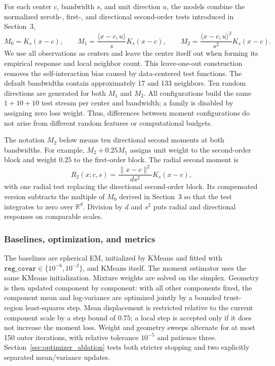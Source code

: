 \documentclass[11pt,a4paper]{article}
\newcommand{\Mzero}{M_0}
\newcommand{\Mone}{M_1}
\newcommand{\Mtwo}{M_2}
\newcommand{\Rtwo}{R_2}
\begin{document}
For each center $c$, bandwidth $s$, and unit direction $u$, the models combine
the normalized zeroth-, first-, and directional second-order tests introduced
in Section~3,
\[
  \Mzero=K_s(x-c),\qquad
  \Mone=\frac{\langle x-c,u\rangle}{s}K_s(x-c),\qquad
  \Mtwo=\frac{\langle x-c,u\rangle^2}{s^2}K_s(x-c).
\]
We use all observations as centers and leave the center itself out when
forming its empirical response and local neighbor count.  This leave-one-out
construction removes the self-interaction bias caused by data-centered test
functions.  The default bandwidths contain approximately 17 and 133
neighbors.  Ten random directions are generated for both $\Mone$ and
$\Mtwo$.  All configurations build the same $1+10+10$ test stream per
center and bandwidth; a family is disabled by assigning zero loss weight.
Thus, differences between moment configurations do not arise from different
random features or computational budgets.

The notation $\Mtwo$ below means ten directional second moments at both
bandwidths.  For example, $\Mtwo+0.25\Mone$ assigns unit weight to the
second-order block and weight $0.25$ to the first-order block.  The radial
second moment is
\[
 \Rtwo(x;c,s)=\frac{\|x-c\|^2}{d s^2}K_s(x-c),
\]
with one radial test replacing the directional second-order block.  Its
compensated version subtracts the multiple of $\Mzero$ derived in Section~3
so that the test integrates to zero over $\mathbb R^d$.  Division by $d$ and
$s^2$ puts radial and directional responses on comparable scales.

\subsubsection{Baselines, optimization, and metrics}

The baselines are spherical EM, initialized by KMeans and fitted with
$\texttt{reg\_covar}\in\{10^{-6},10^{-2}\}$, and KMeans itself.  The moment
estimator uses the same KMeans initialization.  Mixture weights are solved on
the simplex.  Geometry is then updated component by component: with all other
components fixed, the component mean and log-variance are optimized jointly
by a bounded trust-region least-squares step.  Mean displacement is restricted
relative to the current component scale by a step bound of $0.75$; a local step is accepted only if it
does not increase the moment loss.  Weight and geometry sweeps alternate for
at most 150 outer iterations, with relative tolerance $10^{-5}$ and patience
three.  Section~\ref{sec:optimizer_ablation} tests both stricter stopping and
two explicitly separated mean/variance updates.
\end{document}
